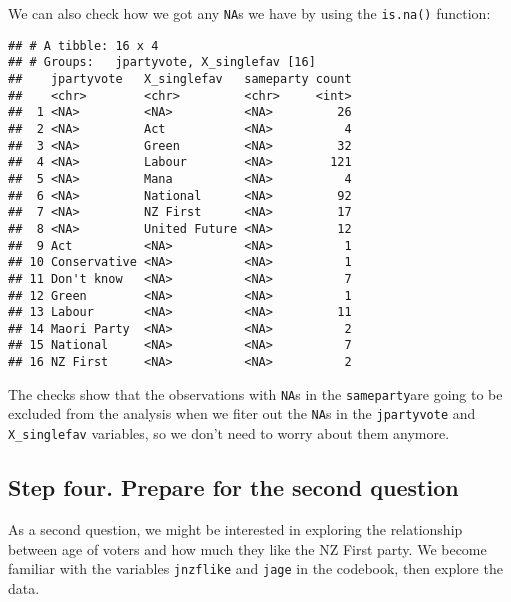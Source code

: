 \documentclass[]{article}
\newenvironment{Shaded}{\begin{snugshade}}{\end{snugshade}}
\newcommand{\KeywordTok}[1]{\textcolor[rgb]{0.13,0.29,0.53}{\textbf{#1}}}
\newcommand{\DataTypeTok}[1]{\textcolor[rgb]{0.13,0.29,0.53}{#1}}
\newcommand{\StringTok}[1]{\textcolor[rgb]{0.31,0.60,0.02}{#1}}
\newcommand{\OperatorTok}[1]{\textcolor[rgb]{0.81,0.36,0.00}{\textbf{#1}}}
\newcommand{\NormalTok}[1]{#1}
\begin{document}
We can also check how we got any \texttt{NA}s we have by using the
\texttt{is.na()} function:

\begin{Shaded}
\end{Shaded}

\begin{verbatim}
## # A tibble: 16 x 4
## # Groups:   jpartyvote, X_singlefav [16]
##    jpartyvote   X_singlefav   sameparty count
##    <chr>        <chr>         <chr>     <int>
##  1 <NA>         <NA>          <NA>         26
##  2 <NA>         Act           <NA>          4
##  3 <NA>         Green         <NA>         32
##  4 <NA>         Labour        <NA>        121
##  5 <NA>         Mana          <NA>          4
##  6 <NA>         National      <NA>         92
##  7 <NA>         NZ First      <NA>         17
##  8 <NA>         United Future <NA>         12
##  9 Act          <NA>          <NA>          1
## 10 Conservative <NA>          <NA>          1
## 11 Don't know   <NA>          <NA>          7
## 12 Green        <NA>          <NA>          1
## 13 Labour       <NA>          <NA>         11
## 14 Maori Party  <NA>          <NA>          2
## 15 National     <NA>          <NA>          7
## 16 NZ First     <NA>          <NA>          2
\end{verbatim}

The checks show that the observations with \texttt{NA}s in the
\texttt{sameparty}are going to be excluded from the analysis when we
fiter out the \texttt{NA}s in the \texttt{jpartyvote} and
\texttt{X\_singlefav} variables, so we don't need to worry about them
anymore.

\subsection{Step four. Prepare for the second
question}\label{step-four.-prepare-for-the-second-question}

As a second question, we might be interested in exploring the
relationship between age of voters and how much they like the NZ First
party. We become familiar with the variables \texttt{jnzflike} and
\texttt{jage} in the codebook, then explore the data.
\end{document}
